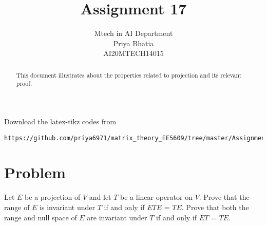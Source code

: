 \documentclass[journal,12pt]{IEEEtran}
\begin{document}
     \def\rightbox#1{\makebox[0in][r]{#1}}
     \def\centbox#1{\makebox[0in]{#1}}
     \def\topbox#1{\raisebox{-\baselineskip}[0in][0in]{#1}}
     \def\midbox#1{\raisebox{-0.5\baselineskip}[0in][0in]{#1}}
\vspace{3cm}
\title{Assignment 17}
\author{Mtech in AI Department\\Priya Bhatia\\AI20MTECH14015}
\maketitle
\bigskip
\renewcommand{\thefigure}{\theenumi}
\renewcommand{\thetable}{\theenumi}
\begin{abstract}
This document illustrates about the properties related to projection and its relevant proof.
\end{abstract}
%
Download the latex-tikz codes from 
%
\begin{lstlisting}
https://github.com/priya6971/matrix_theory_EE5609/tree/master/Assignment17
\end{lstlisting}
\section{\textbf{Problem}}
%
Let $E$ be a projection of $V$ and let $T$ be a linear operator on $V$. Prove that the range of $E$ is invariant under $T$ if and only if $ETE$ = $TE$. Prove that both the range and null space of $E$ are invariant under $T$ if and only if $ET$ = $TE$. 
%
\end{document}
